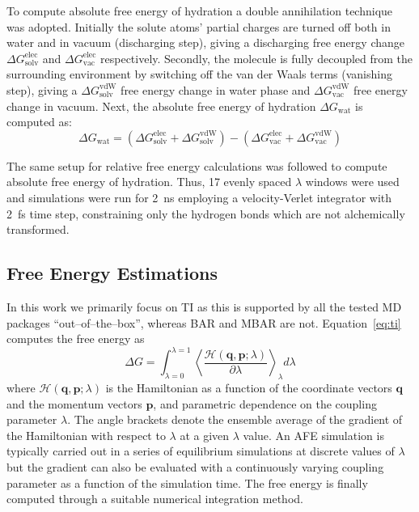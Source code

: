 \documentclass[journal=jctcce,manuscript=article]{achemso}
\renewcommand{\vec}[1]{\mathbf{#1}}
\begin{document}
To compute absolute free energy of hydration a double annihilation 
technique~\cite{jorgensen1988efficient,GILSON19971047,Bosisio2016}
was adopted. 
Initially the solute atoms' partial charges are turned off both in water and in 
vacuum (discharging step), giving a discharging
free energy change $\Delta G_\mathrm{solv}^\mathrm{elec}$ and $\Delta 
G_\mathrm{vac}^\mathrm{elec}$ respectively. Secondly,
the molecule is fully decoupled from the surrounding environment by switching 
off the van der Waals terms (vanishing step), giving a $\Delta 
G_\mathrm{solv}^\mathrm{vdW}$ free energy change in water phase and $\Delta 
G_\mathrm{vac}^\mathrm{vdW}$ free energy change in vacuum. 
Next, the absolute free energy of hydration $\Delta G_\mathrm{wat}$ is computed as:
\begin{equation}
\label{eq:absolutehyd}
\Delta G_\mathrm{wat} = (\Delta G_\mathrm{solv}^\mathrm{elec} + \Delta 
G_\mathrm{solv}^\mathrm{vdW}) - (\Delta G_\mathrm{vac}^\mathrm{elec} + \Delta 
G_\mathrm{vac}^\mathrm{vdW})
\end{equation}

The same setup for relative free energy calculations was followed to compute 
absolute free energy of hydration. Thus, 17 evenly spaced $\lambda$ windows 
were used and simulations were run for \SI{2}{ns} employing a velocity-Verlet 
integrator with \SI{2}{fs} time step, constraining only the hydrogen bonds 
which are not alchemically transformed. 


\subsection{Free Energy Estimations}
\label{sec:analysis}

In this work we primarily focus on TI as this is supported by all the tested MD
packages ``out--of--the--box'', whereas BAR and MBAR are not.
Equation~\ref{eq:ti} computes the free energy as
\begin{equation}\label{eq:ti}
	\Delta G = \int_{\lambda=0}^{\lambda=1}
	\left\langle 
	\frac{\mathscr{H}(\vec{q},\vec{p};\lambda)}{\partial\lambda}\right\rangle_\lambda
	 d\lambda
\end{equation}
where $\mathscr{H}(\vec{q},\vec{p};\lambda)$ is the Hamiltonian as a function 
of the coordinate vectors $\vec{q}$ and the momentum vectors $\vec{p}$, and 
parametric dependence on the coupling parameter $\lambda$.  The angle brackets 
denote the ensemble average of the gradient of the Hamiltonian with respect to 
$\lambda$ at a given $\lambda$ value.  An AFE simulation is typically carried 
out in a series of equilibrium simulations at discrete values of $\lambda$ but 
the gradient can also be evaluated with a continuously varying coupling 
parameter as a function of the simulation time.  The free energy is finally 
computed through a suitable numerical integration method.
\end{document}
